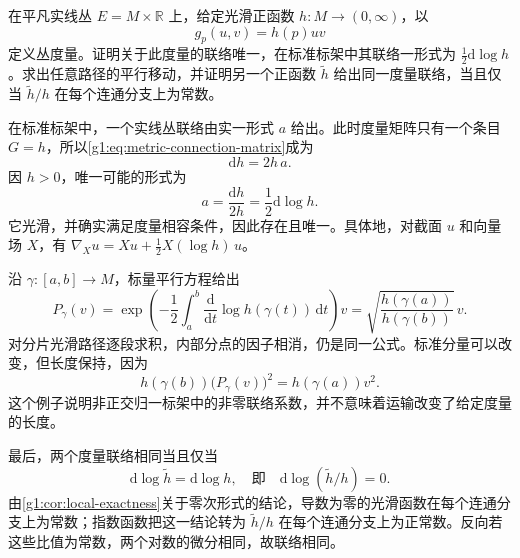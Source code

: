 \begin{exercise}\label{g1:ex:metric-line-connection-unique}
	在平凡实线丛 \(E=M\times\mathbb R\) 上，给定光滑正函数 \(h:M\to(0,\infty)\)，以
	\[
		g_p(u,v)=h(p)uv
	\]
	定义丛度量。证明关于此度量的联络唯一，在标准标架中其联络一形式为 \(\tfrac12\mathrm{d}\log h\)。求出任意路径的平行移动，并证明另一个正函数 \(\widetilde h\) 给出同一度量联络，当且仅当 \(\widetilde h/h\) 在每个连通分支上为常数。
\end{exercise}
\begin{solution}
	在标准标架中，一个实线丛联络由实一形式 \(a\) 给出。此时度量矩阵只有一个条目 \(G=h\)，所以\eqref{g1:eq:metric-connection-matrix}成为
	\[
		\mathrm{d}h=2h\,a.
	\]
	因 \(h>0\)，唯一可能的形式为
	\[
		a=\frac{\mathrm{d}h}{2h}=\frac12\mathrm{d}\log h.
	\]
	它光滑，并确实满足度量相容条件，因此存在且唯一。具体地，对截面 \(u\) 和向量场 \(X\)，有 \(\nabla_Xu=Xu+\tfrac12X(\log h)\,u\)。

	沿 \(\gamma:[a,b]\to M\)，标量平行方程给出
	\[
		P_\gamma(v)
		=\exp\left(-\frac12\int_a^b\frac{\mathrm{d}}{\mathrm{d}t}\log h(\gamma(t))\,\mathrm{d}t\right)v
		=\sqrt{\frac{h(\gamma(a))}{h(\gamma(b))}}\,v.
	\]
	对分片光滑路径逐段求积，内部分点的因子相消，仍是同一公式。标准分量可以改变，但长度保持，因为
	\[
		h(\gamma(b))\bigl(P_\gamma(v)\bigr)^2=h(\gamma(a))v^2.
	\]
	这个例子说明非正交归一标架中的非零联络系数，并不意味着运输改变了给定度量的长度。

	最后，两个度量联络相同当且仅当
	\[
		\mathrm{d}\log\widetilde h=\mathrm{d}\log h,
		\quad\text{即}\quad
		\mathrm{d}\log(\widetilde h/h)=0.
	\]
	由\cref{g1:cor:local-exactness}关于零次形式的结论，导数为零的光滑函数在每个连通分支上为常数；指数函数把这一结论转为 \(\widetilde h/h\) 在每个连通分支上为正常数。反向若这些比值为常数，两个对数的微分相同，故联络相同。
\end{solution}

